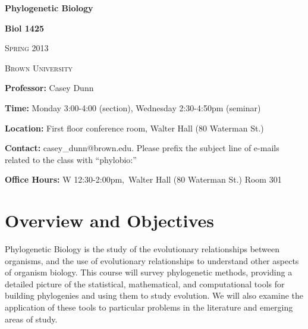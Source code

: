 \documentclass[12pt]{article}
\begin{document}
\thispagestyle{plain} %








\begin{center}
\bigskip




\textbf{Phylogenetic Biology}

\large{\bf{Biol 1425}}

\textsc{Spring 2013}

\textsc{Brown University} \bigskip

\end{center}

\noindent\textbf{Professor: }Casey Dunn\medskip

\noindent\textbf{Time:} Monday 3:00-4:00 (section), Wednesday 2:30-4:50pm (seminar)\medskip

\noindent\textbf{Location:} First floor conference room, Walter Hall (80 Waterman St.)\medskip

\noindent\textbf{Contact:} casey\_dunn@brown.edu. Please prefix the subject line of e-mails related to the class with ``phylobio:''\medskip

\noindent\textbf{Office Hours:} W 12:30-2:00pm,\ Walter Hall (80 Waterman St.) Room 301\medskip

\bigskip



\section*{Overview and Objectives}%
Phylogenetic Biology is the study of the evolutionary relationships between organisms, and the use of evolutionary relationships to understand other aspects of organism biology. This course will survey phylogenetic methods, providing a detailed picture of the statistical, mathematical, and computational tools for building phylogenies and using them to study evolution. We will also examine the application of these tools to particular problems in the literature and emerging areas of study. 
\end{document}
